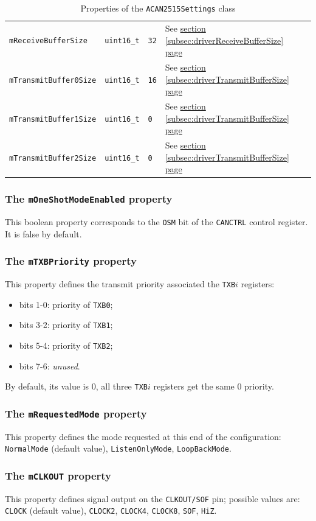 \documentclass[10pt, a4paper, obeyspaces, openany]{extarticle}
\newcommand\refSubsectionPage[1]{\hyperref[subsec:#1]{section \ref*{subsec:#1} page \pageref{subsec:#1}}}
\newcommand \subsubsectionLabel[2]{\subsubsection{#1}\label{subsubsec:#2}}
\newcommand\labelTableau[1]{\label{tab:#1}}
\begin{document}
\begin{table}[!ht]
\begin{tabular}{llllll}
    \texttt{mReceiveBufferSize} & \texttt{uint16\_t} & \texttt{32} & See \refSubsectionPage{driverReceiveBufferSize} \\
    \texttt{mTransmitBuffer0Size} & \texttt{uint16\_t} & \texttt{16} & See \refSubsectionPage{driverTransmitBufferSize} \\
    \texttt{mTransmitBuffer1Size} & \texttt{uint16\_t} & \texttt{0} & See \refSubsectionPage{driverTransmitBufferSize} \\
    \texttt{mTransmitBuffer2Size} & \texttt{uint16\_t} & \texttt{0} & See \refSubsectionPage{driverTransmitBufferSize} \\
   \end{tabular}
  \caption{Properties of the \texttt{ACAN2515Settings} class}
  \labelTableau{tablePropertiesACAN2515Settings}
\end{table}


\subsubsectionLabel{The \texttt{mOneShotModeEnabled} property}{mOneShotModeEnabled}

This boolean property corresponds to the \texttt{OSM} bit of the \texttt{CANCTRL} control register. It is false by default.



\subsubsectionLabel{The \texttt{mTXBPriority} property}{mTXBPriority}

This property defines the transmit priority associated the \texttt{TXB$i$} registers:
\begin{itemize}
  \item bits 1-0: priority of \texttt{TXB0};
  \item bits 3-2: priority of \texttt{TXB1};
  \item bits 5-4: priority of \texttt{TXB2};
  \item bits 7-6: \emph{unused}.
\end{itemize}

By default, its value is $0$, all three \texttt{TXB$i$} registers get the same $0$ priority.



\subsubsectionLabel{The \texttt{mRequestedMode} property}{mRequestedMode}

This property defines the mode requested at this end of the configuration: \texttt{NormalMode} (default value), \texttt{ListenOnlyMode}, \texttt{LoopBackMode}.





\subsubsectionLabel{The \texttt{mCLKOUT} property}{mCLKOUT}

This property defines signal output on the \texttt{CLKOUT/SOF} pin; possible values are: \texttt{CLOCK} (default value), \texttt{CLOCK2}, \texttt{CLOCK4}, \texttt{CLOCK8}, \texttt{SOF}, \texttt{HiZ}.
\end{document}
